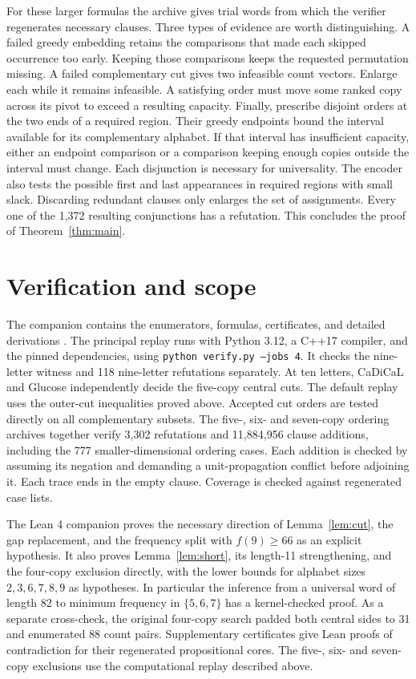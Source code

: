 \documentclass[11pt]{article}
\begin{document}
For these larger formulas the archive gives trial words from which the verifier regenerates necessary clauses. Three types of evidence are worth distinguishing. A failed greedy embedding retains the comparisons that made each skipped occurrence too early. Keeping those comparisons keeps the requested permutation missing. A failed complementary cut gives two infeasible count vectors. Enlarge each while it remains infeasible. A satisfying order must move some ranked copy across its pivot to exceed a resulting capacity. Finally, prescribe disjoint orders at the two ends of a required region. Their greedy endpoints bound the interval available for its complementary alphabet. If that interval has insufficient capacity, either an endpoint comparison or a comparison keeping enough copies outside the interval must change. Each disjunction is necessary for universality. The encoder also tests the possible first and last appearances in required regions with small slack. Discarding redundant clauses only enlarges the set of assignments. Every one of the 1,372 resulting conjunctions has a refutation. This concludes the proof of Theorem~\ref{thm:main}.

\section{Verification and scope}
The companion contains the enumerators, formulas, certificates, and detailed derivations \cite{companion}. The principal replay runs with Python 3.12, a C++17 compiler, and the pinned dependencies, using \texttt{python verify.py --jobs 4}. It checks the nine-letter witness and 118 nine-letter refutations separately. At ten letters, CaDiCaL and Glucose independently decide the five-copy central cuts. The default replay uses the outer-cut inequalities proved above. Accepted cut orders are tested directly on all complementary subsets. The five-, six- and seven-copy ordering archives together verify 3,302 refutations and 11,884,956 clause additions, including the 777 smaller-dimensional ordering cases. Each addition is checked by assuming its negation and demanding a unit-propagation conflict before adjoining it. Each trace ends in the empty clause. Coverage is checked against regenerated case lists.

The Lean 4 companion proves the necessary direction of Lemma~\ref{lem:cut}, the gap replacement, and the frequency split with $f(9)\ge66$ as an explicit hypothesis. It also proves Lemma~\ref{lem:short}, its length-11 strengthening, and the four-copy exclusion directly, with the lower bounds for alphabet sizes $2,3,6,7,8,9$ as hypotheses. In particular the inference from a universal word of length 82 to minimum frequency in $\{5,6,7\}$ has a kernel-checked proof. As a separate cross-check, the original four-copy search padded both central sides to 31 and enumerated 88 count pairs. Supplementary certificates give Lean proofs of contradiction for their regenerated propositional cores. The five-, six- and seven-copy exclusions use the computational replay described above.
\end{document}
